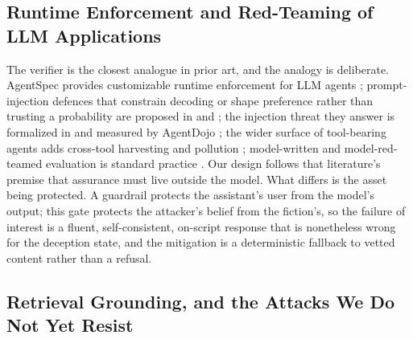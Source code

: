 \subsection{Runtime Enforcement and Red-Teaming of LLM Applications}

The verifier is the closest analogue in prior art, and the analogy is
deliberate. AgentSpec provides customizable runtime enforcement for LLM
agents \cite{wang2026agentspec}; prompt-injection defences that constrain
decoding or shape preference rather than trusting a probability are
proposed in \cite{chen2025struq} and \cite{chen2025secalign}; the injection
threat they answer is formalized in \cite{greshake2023} and measured by
AgentDojo \cite{debenedetti2024agentdojo}; the wider surface of tool-bearing
agents adds cross-tool harvesting and pollution \cite{li2026dissonances};
model-written and
model-red-teamed evaluation is standard practice
\cite{ganguli2022,perez2022,bai2022,christiano2017}. Our design follows
that literature's premise that assurance must live outside the model. What
differs is the asset being protected. A guardrail protects the assistant's
user from the model's output; this gate protects the attacker's belief from
the fiction's, so the failure of interest is a fluent, self-consistent,
on-script response that is nonetheless wrong for the deception state, and
the mitigation is a deterministic fallback to vetted content rather than a
refusal.

\subsection{Retrieval Grounding, and the Attacks We Do Not Yet Resist}

